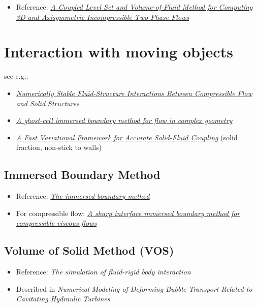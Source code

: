 \begin{itemize}
    \item Reference: \textit{\href{http://pages.csam.montclair.edu/~yecko/icodes/SussmanPuckett_LevelSetVOF.pdf}{A Coupled Level Set and Volume-of-Fluid Method for Computing 3D and Axisymmetric Incompressible Two-Phase Flows}}
\end{itemize}

\chapter{Interaction with moving objects}

see e.g.:

\begin{itemize}
    \item \textit{\href{http://physbam.stanford.edu/~fedkiw/papers/stanford2010-04.pdf}{Numerically Stable Fluid-Structure Interactions Between Compressible Flow and Solid Structures}}
    \item \textit{\href{http://efdl.as.ntu.edu.tw/research/papers/JCP03GCIBM.pdf}{A ghost-cell immersed boundary method for flow in complex geometry}}
    \item \textit{\href{http://www.cs.columbia.edu/~batty/papers/Batty07.pdf}{A Fast Variational Framework for Accurate Solid-Fluid Coupling}} (solid fraction, non-stick to walls)
\end{itemize}

\section{Immersed Boundary Method}

\begin{itemize}
    \item Reference: \textit{\href{http://www4.ncsu.edu/~zhilin/TEACHING/MA798Z/Peskin1.pdf}{The immersed boundary method}}
    \item For compressible flow: \textit{\href{http://www.cecs.wright.edu/~haibo.dong/wp-content/themes/publications/IBM_JCP_2007.pdf}{A sharp interface immersed boundary method for compressible viscous flows}}
\end{itemize}

\section{Volume of Solid Method (VOS)}

\begin{itemize}
    \item Reference: \textit{The simulation of fluid-rigid body interaction}
    \item Described in \textit{Numerical Modeling of Deforming Bubble Transport Related to Cavitating Hydraulic Turbines}
\end{itemize}

